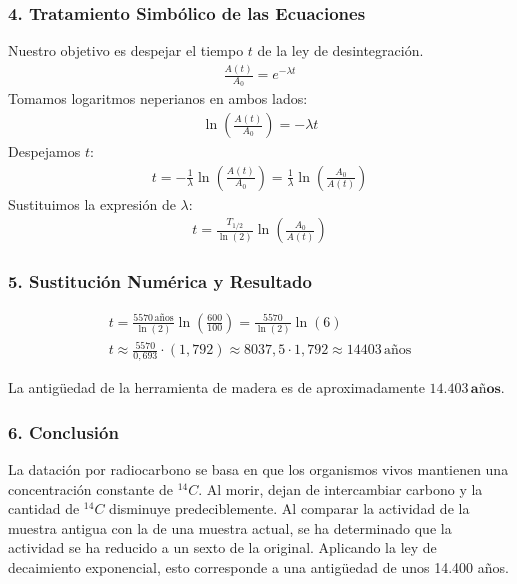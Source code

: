 \subsubsection*{4. Tratamiento Simbólico de las Ecuaciones}
Nuestro objetivo es despejar el tiempo $t$ de la ley de desintegración.
\begin{gather}
    \frac{A(t)}{A_0} = e^{-\lambda t}
\end{gather}
Tomamos logaritmos neperianos en ambos lados:
\begin{gather}
    \ln\left(\frac{A(t)}{A_0}\right) = -\lambda t
\end{gather}
Despejamos $t$:
\begin{gather}
    t = -\frac{1}{\lambda} \ln\left(\frac{A(t)}{A_0}\right) = \frac{1}{\lambda} \ln\left(\frac{A_0}{A(t)}\right)
\end{gather}
Sustituimos la expresión de $\lambda$:
\begin{gather}
    t = \frac{T_{1/2}}{\ln(2)} \ln\left(\frac{A_0}{A(t)}\right)
\end{gather}

\subsubsection*{5. Sustitución Numérica y Resultado}
\begin{gather}
    t = \frac{5570\,\text{años}}{\ln(2)} \ln\left(\frac{600}{100}\right) = \frac{5570}{\ln(2)} \ln(6) \\
    t \approx \frac{5570}{0,693} \cdot (1,792) \approx 8037,5 \cdot 1,792 \approx 14403\,\text{años}
\end{gather}
\begin{cajaresultado}
    La antigüedad de la herramienta de madera es de aproximadamente $\boldsymbol{14.403\,\textbf{años}}$.
\end{cajaresultado}

\subsubsection*{6. Conclusión}
\begin{cajaconclusion}
La datación por radiocarbono se basa en que los organismos vivos mantienen una concentración constante de ${}^{14}C$. Al morir, dejan de intercambiar carbono y la cantidad de ${}^{14}C$ disminuye predeciblemente. Al comparar la actividad de la muestra antigua con la de una muestra actual, se ha determinado que la actividad se ha reducido a un sexto de la original. Aplicando la ley de decaimiento exponencial, esto corresponde a una antigüedad de unos 14.400 años.
\end{cajaconclusion}

